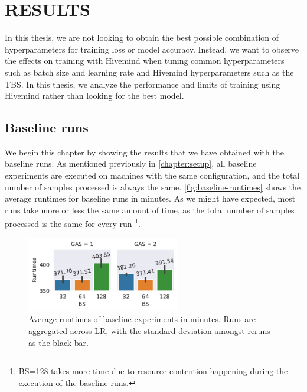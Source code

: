 \chapter{RESULTS}\label{chapter:results}

In this thesis, we are not looking to obtain the best possible combination of hyperparameters for training loss or model accuracy.
Instead, we want to observe the effects on training with Hivemind when tuning common hyperparameters such as batch size and learning rate and Hivemind hyperparameters such as the TBS.
In this thesis, we analyze the performance and limits of training using Hivemind rather than looking for the best model.

\section{Baseline runs}

We begin this chapter by showing the results that we have obtained with the baseline runs.
As mentioned previously in \autoref{chapter:setup}, all baseline experiments are executed on machines with the same configuration, and the total number of samples processed is always the same.
\autoref{fig:baseline-runtimes} shows the average runtimes for baseline runs in minutes.
As we might have expected, most runs take more or less the same amount of time, as the total number of samples processed is the same for every run
\footnote{
    BS=128 takes more time due to resource contention happening during the execution of the baseline runs.
}.

\begin{figure}[ht]
    \centering
    \includegraphics[width=0.6\textwidth]{./figures/06_barplot-runtime_baseline-16vCPUs-GAS-1.pdf}
    \caption{Average runtimes of baseline experiments in minutes. Runs are aggregated across LR, with the standard deviation amongst reruns as the black bar.}
    \label{fig:baseline-runtimes}
\end{figure}

